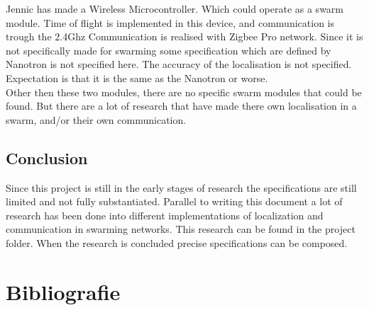 \documentclass[10pt,a4paper]{article}
\begin{document}
Jennic has made a Wireless Microcontroller. Which could operate as a swarm module. Time of flight is implemented in this device, and communication is trough the 2.4Ghz Communication is realised with Zigbee Pro network. Since it is not specifically made for swarming some specification which are defined by Nanotron is not specified here. The accuracy of the localisation is not specified. Expectation is that it is the same as the Nanotron or worse. \cite{wirelessmicrocontroller}\\

Other then these two modules, there are no specific swarm modules that could be found. But there are a lot of research that have made there own localisation in a swarm, and/or their own communication. 

\subsection{Conclusion}
Since this project is still in the early stages of research the specifications are still limited and not fully substantiated. Parallel to writing this document a lot of research has been done into different implementations of localization and communication in swarming networks. This research can be found in the project folder. When the research is concluded precise specifications can be composed. 

\newpage



\section{Bibliografie}


\end{document}
